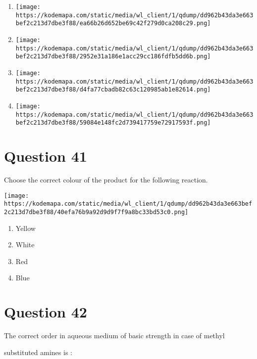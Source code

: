 \documentclass{article}
\begin{document}
\begin{enumerate}[label=(\alph*)]
\item \texttt{[image: https://kodemapa.com/static/media/wl\_client/1/qdump/dd962b43da3e663bef2c213d7dbe3f88/ea66b26d652be69c42f279d0ca208c29.png]}


\item \texttt{[image: https://kodemapa.com/static/media/wl\_client/1/qdump/dd962b43da3e663bef2c213d7dbe3f88/2952e31a186e1acc29cc186fdfb5dd6b.png]}


\item \texttt{[image: https://kodemapa.com/static/media/wl\_client/1/qdump/dd962b43da3e663bef2c213d7dbe3f88/d4fa77cbadb82c63c120985ab1e82614.png]}


\item \texttt{[image: https://kodemapa.com/static/media/wl\_client/1/qdump/dd962b43da3e663bef2c213d7dbe3f88/59084e148fc2d739417759e72917593f.png]}


\end{enumerate}
\newpage
\section*{Question 41}
Choose the correct colour of the product for the following reaction.



\texttt{[image: https://kodemapa.com/static/media/wl\_client/1/qdump/dd962b43da3e663bef2c213d7dbe3f88/40efa76b9a92d9d9f7f9a8bc33bd53c0.png]}\\


\begin{enumerate}[label=(\alph*)]
\item Yellow


\item White


\item Red


\item Blue


\end{enumerate}
\newpage
\section*{Question 42}
The correct order in aqueous medium of basic strength in case of methyl

substituted amines is :
\end{document}
